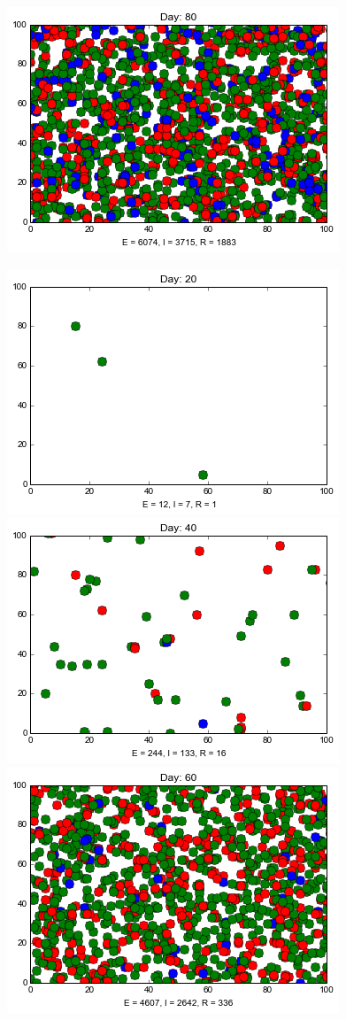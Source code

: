 \begin{figure}[h]
\includegraphics[scale=0.28]{images/4t80.png} 

\medskip
\includegraphics[scale=0.28]{images/5t20.png} \quad
\includegraphics[scale=0.28]{images/5t40.png} \quad
\includegraphics[scale=0.28]{images/5t60.png} \quad

\end{figure}

